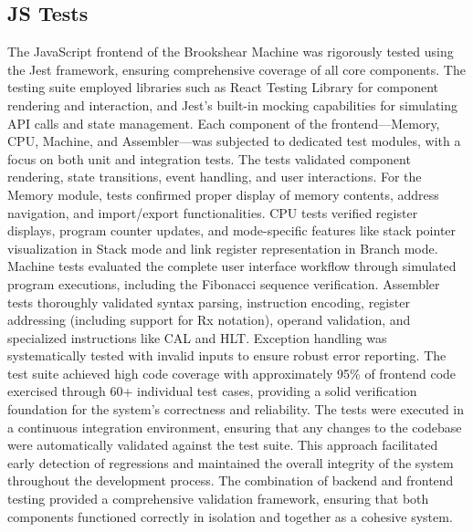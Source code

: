 \subsection{JS Tests}
The JavaScript frontend of the Brookshear Machine was rigorously tested using the Jest framework, ensuring comprehensive coverage of all core components. The testing suite employed libraries such as React Testing Library for component rendering and interaction, and Jest's built-in mocking capabilities for simulating API calls and state management. Each component of the frontend—Memory, CPU, Machine, and Assembler—was subjected to dedicated test modules, with a focus on both unit and integration tests. The tests validated component rendering, state transitions, event handling, and user interactions. For the Memory module, tests confirmed proper display of memory contents, address navigation, and import/export functionalities. CPU tests verified register displays, program counter updates, and mode-specific features like stack pointer visualization in Stack mode and link register representation in Branch mode. Machine tests evaluated the complete user interface workflow through simulated program executions, including the Fibonacci sequence verification. Assembler tests thoroughly validated syntax parsing, instruction encoding, register addressing (including support for Rx notation), operand validation, and specialized instructions like CAL and HLT. Exception handling was systematically tested with invalid inputs to ensure robust error reporting. The test suite achieved high code coverage with approximately 95\% of frontend code exercised through 60+ individual test cases, providing a solid verification foundation for the system's correctness and reliability.
The tests were executed in a continuous integration environment, ensuring that any changes to the codebase were automatically validated against the test suite. This approach facilitated early detection of regressions and maintained the overall integrity of the system throughout the development process. The combination of backend and frontend testing provided a comprehensive validation framework, ensuring that both components functioned correctly in isolation and together as a cohesive system.

